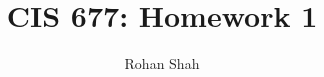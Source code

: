 \documentclass[12pt]{article}
\begin{document}
\pagestyle{plain}
\titleformat{\subsection}[runin]
  {\normalfont\large\bfseries}{\thesubsection}{1em}{}
\titleformat{\subsubsection}[runin]
  {\normalfont\large\bfseries}{\thesubsubsection}{1em}{}

\title{CIS 677: Homework 1}
\author{Rohan Shah}
\date{}

\maketitle
\end{document}
